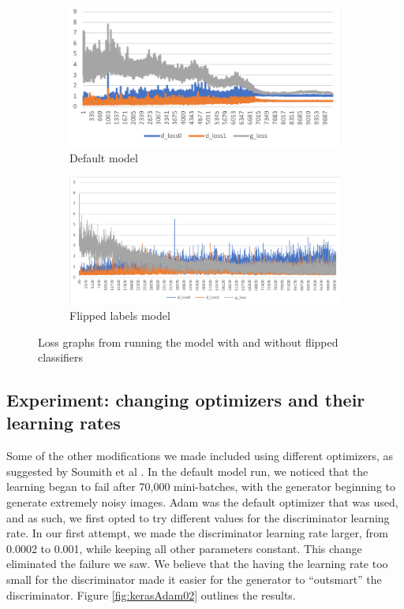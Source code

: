 \documentclass{article} %
\begin{document}
\begin{figure}[h!]
	\centering
	\begin{subfigure}[b]{0.49\linewidth}
		\includegraphics[width=\linewidth]{syed-default-loss.png}
		\caption{Default model}
		\label{fig:kerasLabelsFlippedLoss100k}
	\end{subfigure}
	\begin{subfigure}[b]{0.49\linewidth}
		\includegraphics[width=\linewidth]{syed-flipped-loss.png}
		\caption{Flipped labels model}
		\label{fig:kerasLabelsDefaultLoss30k}
	\end{subfigure}
	\caption{Loss graphs from running the model with and without flipped classifiers}
	\label{fig:kerasLabelsGen}
\end{figure}

\subsection{Experiment: changing optimizers and their learning rates}

Some of the other modifications we made included using different optimizers, as suggested by Soumith et al \cite{ganhacks}.  In the default model run, we noticed that the learning began to fail after 70,000 mini-batches, with the generator beginning to generate extremely noisy images.  Adam was the default optimizer that was used, and as such, we first opted to try different values for the discriminator learning rate.  In our first attempt, we made the discriminator learning rate larger, from 0.0002 to 0.001, while keeping all other parameters constant.  This change eliminated the failure we saw.  We believe that the having the learning rate too small for the discriminator made it easier for the generator to “outsmart” the discriminator.  Figure \ref{fig:kerasAdam02} outlines the results.
\end{document}

